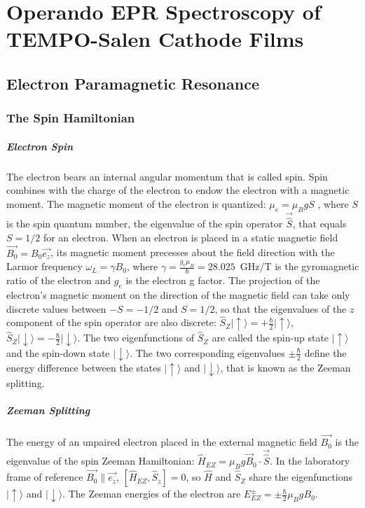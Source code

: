 \chapter{Operando EPR Spectroscopy of TEMPO-Salen Cathode Films}
\section{Electron Paramagnetic Resonance}
\subsection{The Spin Hamiltonian}
\paragraph*{Electron Spin}
The electron bears an internal angular momentum that is called spin. Spin combines with the charge of the electron to endow the electron with a magnetic moment. The magnetic moment of the electron is quantized: $\mu_e=\mu_BgS$ \cite{SternGerlach1922}, where $S$ is the spin quantum number, the eigenvalue of the spin operator $\vec{\hat{S}}$, that equals $S=1/2$ for an electron. When an electron is placed in a static magnetic field $\vec{B_0}=B_0 \vec{e_z}$, its magnetic moment precesses about the field direction with the Larmor frequency $\omega_L = \gamma B_0$, where $\gamma=\frac{g_e\mu_B}{\hbar}=28.025$~GHz/T is the gyromagnetic ratio of the electron and $g_e$ is the electron g factor. The projection of the electron's magnetic moment on the direction of the magnetic field can take only discrete values between $-S=-1/2$ and $S=1/2$, so that the eigenvalues of the $z$ component of the spin operator are also discrete: $\hat{S}_Z\vert{\uparrow\rangle}=+\frac{\hbar}{2}\vert{\uparrow\rangle}$, $\hat{S}_Z\vert{\downarrow\rangle}=-\frac{\hbar}{2}\vert{\downarrow\rangle}$. The two eigenfunctions of $\hat{S}_Z$ are called the spin-up state $\vert{\uparrow\rangle}$ and the spin-down state $\vert{\downarrow\rangle}$. The two corresponding eigenvalues $\pm\frac{\hbar}{2}$ define the energy difference between the states $\vert{\uparrow\rangle}$ and $\vert{\downarrow\rangle}$, that is known as the Zeeman splitting.

\paragraph*{Zeeman Splitting}
The energy of an unpaired electron placed in the external magnetic field $\vec{B_0}$ is the eigenvalue of the spin Zeeman Hamiltonian: $\hat{H}_{EZ} = \mu_B g\vec{B}_0\cdot\vec{\hat{S}}$. In the laboratory frame of reference $\vec{B_0}\parallel\vec{e_z}$, $\left[\hat{H}_{EZ},\hat{S}_z\right]=0$, so $\hat{H}$ and $\hat{S}_Z$ share the eigenfunctions $\vert{\uparrow\rangle}$ and $\vert{\downarrow\rangle}$. The Zeeman energies of the electron are $E_{EZ}^{\pm} = \pm \frac{\hbar}{2}\mu_B g B_0$. 


